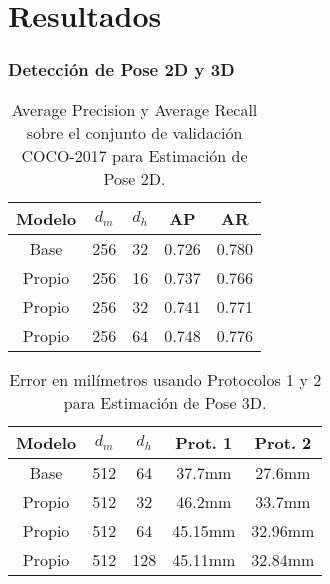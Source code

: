 \documentclass{beamer}
\begin{document}
\section{Resultados}

\begin{frame}
\frametitle{Detección de Pose 2D y 3D}

\tiny

\begin{table}
    \begin{center}
    \begin{tabular}{| c | c | c | c | c |}
        \hline
        \textbf{Modelo} & \textbf{$d_m$} & \textbf{$d_h$} & \textbf{AP} & \textbf{AR} \\
        \hline
        \hline
        Base & 256 & 32 & 0.726 & 0.780 \\
        \hline
        \hline
        Propio & 256 & 16 & 0.737 & 0.766 \\
        \hline
        Propio & 256 & 32 & 0.741 & 0.771 \\
        \hline
        Propio & 256 & 64 & 0.748 & 0.776 \\
        \hline
    \end{tabular}
    \end{center}
\caption{Average Precision y Average Recall sobre el conjunto de validación COCO-2017 para
         Estimación de Pose 2D.}
\label{table:2d}
\end{table}

\begin{table}
    \begin{center}
    \begin{tabular}{| c | c | c | c | c |}
        \hline
        \textbf{Modelo} & \textbf{$d_m$} & \textbf{$d_h$} & \textbf{Prot. 1} & \textbf{Prot. 2} \\
        \hline
        \hline
        Base & 512 & 64 & 37.7mm & 27.6mm \\
        \hline
        \hline
        Propio & 512 & 32 & 46.2mm & 33.7mm \\
        \hline
        Propio & 512 & 64 & 45.15mm & 32.96mm \\
        \hline
        Propio & 512 & 128 & 45.11mm & 32.84mm \\
        \hline
    \end{tabular}
    \end{center}
\caption{Error en milímetros usando Protocolos 1 y 2 para Estimación de Pose 3D.}
\label{table:3d}
\end{table}

\end{frame}
\end{document}
